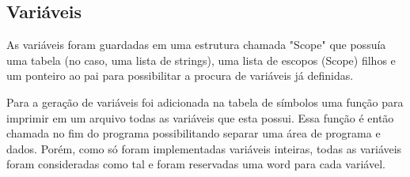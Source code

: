 \subsection{Variáveis}

As variáveis foram guardadas em uma estrutura chamada "Scope" que possuía uma tabela (no caso, uma lista de strings), uma lista de escopos (Scope) filhos e um ponteiro ao pai para possibilitar a procura de variáveis já definidas.

Para a geração de variáveis foi adicionada na tabela de símbolos uma função para imprimir em um arquivo todas as variáveis que esta possui. Essa função é então chamada no fim do programa possibilitando separar uma área de programa e dados. Porém, como só foram implementadas variáveis inteiras, todas as variáveis foram consideradas como tal e foram reservadas uma word para cada variável.